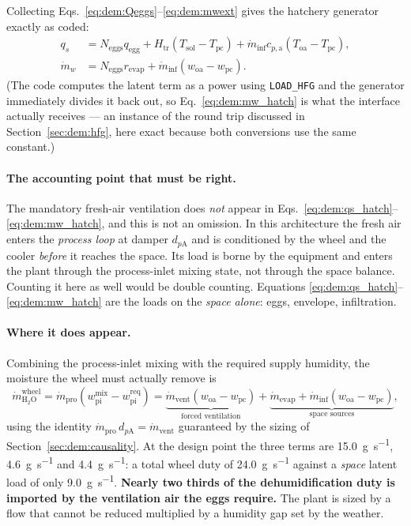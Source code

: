 \documentclass[11pt]{article}
\newcommand{\mdp}{\ensuremath{\dot m_{\mathrm{pro}}}}
\newcommand{\mdv}{\ensuremath{\dot m_{\mathrm{vent}}}}
\newcommand{\mdw}{\ensuremath{\dot m_{w}}}
\newcommand{\qs}{\ensuremath{q_{s}}}
\begin{document}
Collecting Eqs.~\eqref{eq:dem:Qeggs}--\eqref{eq:dem:mwext} gives the hatchery
generator exactly as coded:
\begin{align}
\qs&=N_{\mathrm{eggs}}q_{\mathrm{egg}}
+H_{\mathrm{tr}}\left(T_{\mathrm{sol}}-T_{\mathrm{pc}}\right)
+\dot m_{\mathrm{inf}}c_{p,\mathrm{a}}\left(T_{\mathrm{oa}}-T_{\mathrm{pc}}\right),
\label{eq:dem:qs_hatch}\\
\mdw&=N_{\mathrm{eggs}}r_{\mathrm{evap}}
+\dot m_{\mathrm{inf}}\left(w_{\mathrm{oa}}-w_{\mathrm{pc}}\right).
\label{eq:dem:mw_hatch}
\end{align}
(The code computes the latent term as a power using \verb|LOAD_HFG| and the
generator immediately divides it back out, so Eq.~\eqref{eq:dem:mw_hatch} is what
the interface actually receives --- an instance of the round trip discussed in
Section~\ref{sec:dem:hfg}, here exact because both conversions use the same
constant.)

\paragraph{The accounting point that must be right.} The mandatory fresh-air
ventilation does \emph{not} appear in
Eqs.~\eqref{eq:dem:qs_hatch}--\eqref{eq:dem:mw_hatch}, and this is not an
omission. In this architecture the fresh air enters the \emph{process loop} at
damper $d_{p\mathrm{A}}$ and is conditioned by the wheel and the cooler
\emph{before} it reaches the space. Its load is borne by the equipment and enters
the plant through the process-inlet mixing state, not through the space balance.
Counting it here as well would be double counting. Equations
\eqref{eq:dem:qs_hatch}--\eqref{eq:dem:mw_hatch} are the loads on the \emph{space
alone}: eggs, envelope, infiltration.

\paragraph{Where it does appear.} Combining the process-inlet mixing with the
required supply humidity, the moisture the wheel must actually remove is
\begin{equation}
\dot m_{\mathrm{H_2O}}^{\mathrm{wheel}}
=\mdp\left(w_{\mathrm{pi}}^{\mathrm{mix}}-w_{\mathrm{pi}}^{\mathrm{req}}\right)
=\underbrace{\mdv\left(w_{\mathrm{oa}}-w_{\mathrm{pc}}\right)}_{\text{forced ventilation}}
+\underbrace{\dot m_{\mathrm{evap}}
+\dot m_{\mathrm{inf}}\left(w_{\mathrm{oa}}-w_{\mathrm{pc}}\right)}_{\text{space sources}},
\label{eq:dem:trueduty}
\end{equation}
using the identity $\mdp\,d_{p\mathrm{A}}=\mdv$ guaranteed by the sizing of
Section~\ref{sec:dem:causality}. At the design point the three terms are
\SI{15.0}{\gram\per\second}, \SI{4.6}{\gram\per\second} and
\SI{4.4}{\gram\per\second}: a total wheel duty of
\SI{24.0}{\gram\per\second} against a \emph{space} latent load of only
\SI{9.0}{\gram\per\second}. \textbf{Nearly two thirds of the dehumidification
duty is imported by the ventilation air the eggs require.} The plant is sized by
a flow that cannot be reduced multiplied by a humidity gap set by the weather.
\end{document}
